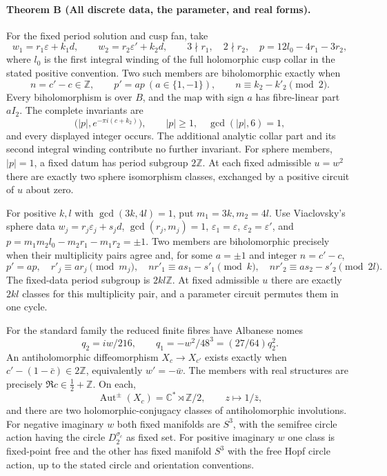 \documentclass[11pt,a4paper]{article}
\theoremstyle{definition}
\newcommand{\C}{\mathbb C}\newcommand{\R}{\mathbb R}\newcommand{\Z}{\mathbb Z}\newcommand{\Q}{\mathbb Q}\newcommand{\N}{\mathbb N}\newcommand{\F}{\mathbb F}
\begin{document}
\hypertarget{main-I-B}{}
\paragraph{Theorem B (All discrete data, the parameter, and real forms).}
\label{series:I:B}
For the fixed period solution and cusp fan, take
\[
 w_1=r_1\varepsilon+k_1d,\qquad
 w_2=r_2\varepsilon'+k_2d,\qquad
 3\nmid r_1,\quad2\nmid r_2,
 \quad p=12l_0-4r_1-3r_2,
\]
where $l_0$ is the first integral winding of the full holomorphic
cusp collar in the stated positive convention.  Two such members
are biholomorphic exactly when
\[
 n=c'-c\in\Z,\qquad p'=ap\ (a\in\{1,-1\}),\qquad
 n\equiv k_2-k'_2\pmod2.
\]
Every biholomorphism is over $B$, and the map with sign $a$ has
fibre-linear part $aI_2$.  The complete invariants are
\[
 \bigl(|p|,e^{-\pi i(c+k_2)}\bigr),\qquad
 |p|\ge1,\quad\gcd(|p|,6)=1,
\]
and every displayed integer occurs.  The additional analytic
collar part and its second integral winding contribute no further
invariant.  For sphere members, $|p|=1$, a fixed datum has period
subgroup $2\Z$.  At each fixed admissible $u=w^2$ there are
exactly two sphere isomorphism classes, exchanged by a positive
circuit of $u$ about zero.

For positive $k,l$ with $\gcd(3k,4l)=1$, put $m_1=3k,m_2=4l$.
Use Viaclovsky's sphere data
$w_j=r_j\varepsilon_j+s_jd$, $\gcd(r_j,m_j)=1$,
$\varepsilon_1=\varepsilon$, $\varepsilon_2=\varepsilon'$, and
$p=m_1m_2l_0-m_2r_1-m_1r_2=\pm1$.
Two members are biholomorphic precisely when their multiplicity
pairs agree and, for some $a=\pm1$ and integer $n=c'-c$,
\[
 p'=ap,\quad r'_j\equiv ar_j\pmod{m_j},\quad
 nr'_1\equiv as_1-s'_1\pmod{k},\quad
 nr'_2\equiv as_2-s'_2\pmod{2l}.
\]
The fixed-data period subgroup is $2kl\Z$.  At fixed admissible
$u$ there are exactly $2kl$ classes for this multiplicity pair,
and a parameter circuit permutes them in one cycle.

For the standard family the reduced finite fibres have Albanese
nomes
\[
 q_2=iw/216,\qquad q_1=-w^2/48^3=(27/64)q_2^2.
\]
An antiholomorphic diffeomorphism $X_c\to X_{c'}$ exists exactly
when $c'-(1-\bar c)\in2\Z$, equivalently $w'=-\bar w$.
The members with real structures are precisely
$\Re c\in\tfrac12+\Z$.  On each,
\[
 \operatorname{Aut}^{\pm}(X_c)=\C^*\rtimes\Z/2,
 \qquad z\longmapsto1/\bar z,
\]
and there are two holomorphic-conjugacy classes of antiholomorphic
involutions.  For negative imaginary $w$ both fixed manifolds
are $S^3$, with the semifree circle action having the circle
$D_2^{\sigma_c}$ as fixed set.  For positive imaginary $w$ one
class is fixed-point free and the other has fixed manifold $S^3$
with the free Hopf circle action, up to the stated circle and
orientation conventions.
\end{document}
